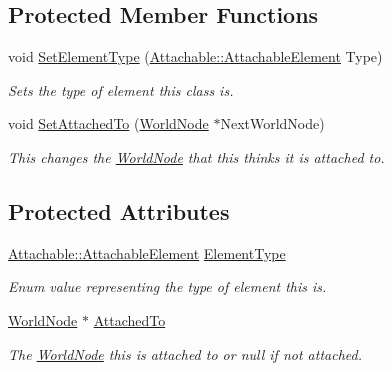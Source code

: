 \subsection*{Protected Member Functions}
\begin{DoxyCompactItemize}
\item 
void \hyperlink{classphys_1_1Attachable_a74361315eba9e4f0ce288518c92541fa}{SetElementType} (\hyperlink{classphys_1_1Attachable_acd1fca033e7cc0bb3024a92d466d213a}{Attachable::AttachableElement} Type)
\begin{DoxyCompactList}\small\item\em Sets the type of element this class is. \item\end{DoxyCompactList}\item 
void \hyperlink{classphys_1_1Attachable_a262c21d83f7d5a1bc96037fa59b7faaf}{SetAttachedTo} (\hyperlink{classphys_1_1WorldNode}{WorldNode} $\ast$NextWorldNode)
\begin{DoxyCompactList}\small\item\em This changes the \hyperlink{classphys_1_1WorldNode}{WorldNode} that this thinks it is attached to. \item\end{DoxyCompactList}\end{DoxyCompactItemize}
\subsection*{Protected Attributes}
\begin{DoxyCompactItemize}
\item 
\hypertarget{classphys_1_1Attachable_af574d5f08a304c6e0ae002bb2fc057c7}{
\hyperlink{classphys_1_1Attachable_acd1fca033e7cc0bb3024a92d466d213a}{Attachable::AttachableElement} \hyperlink{classphys_1_1Attachable_af574d5f08a304c6e0ae002bb2fc057c7}{ElementType}}
\label{df/dbd/classphys_1_1Attachable_af574d5f08a304c6e0ae002bb2fc057c7}

\begin{DoxyCompactList}\small\item\em Enum value representing the type of element this is. \item\end{DoxyCompactList}\item 
\hypertarget{classphys_1_1Attachable_af1009b5b9cfee1015079e8439182265e}{
\hyperlink{classphys_1_1WorldNode}{WorldNode} $\ast$ \hyperlink{classphys_1_1Attachable_af1009b5b9cfee1015079e8439182265e}{AttachedTo}}
\label{df/dbd/classphys_1_1Attachable_af1009b5b9cfee1015079e8439182265e}

\begin{DoxyCompactList}\small\item\em The \hyperlink{classphys_1_1WorldNode}{WorldNode} this is attached to or null if not attached. \item\end{DoxyCompactList}\end{DoxyCompactItemize}
